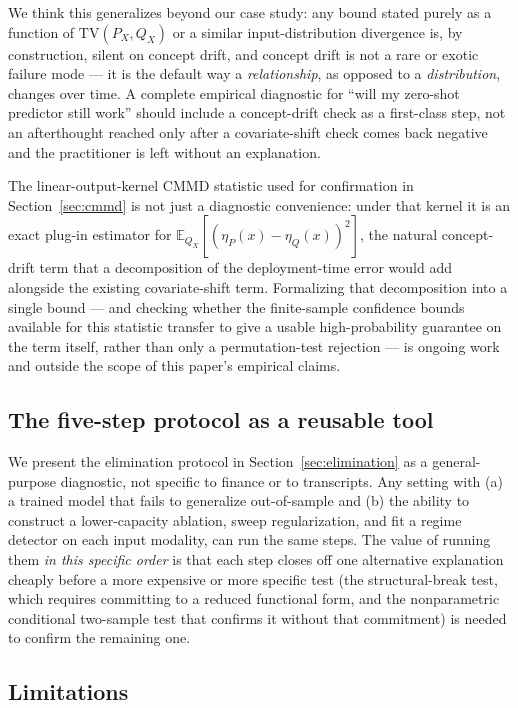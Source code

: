 \documentclass[11pt]{article}
\newcommand{\TV}{\mathrm{TV}}
\begin{document}
We think this generalizes beyond our case study: any bound stated purely as a function of $\TV(P_X,Q_X)$ or a similar input-distribution divergence is, by construction, silent on concept drift, and concept drift is not a rare or exotic failure mode --- it is the default way a \emph{relationship}, as opposed to a \emph{distribution}, changes over time. A complete empirical diagnostic for ``will my zero-shot predictor still work'' should include a concept-drift check as a first-class step, not an afterthought reached only after a covariate-shift check comes back negative and the practitioner is left without an explanation.

The linear-output-kernel CMMD statistic used for confirmation in Section~\ref{sec:cmmd} is not just a diagnostic convenience: under that kernel it is an exact plug-in estimator for $\mathbb{E}_{Q_X}[(\eta_P(x)-\eta_Q(x))^2]$, the natural concept-drift term that a decomposition of the deployment-time error would add alongside the existing covariate-shift term. Formalizing that decomposition into a single bound --- and checking whether the finite-sample confidence bounds available for this statistic \citep{massiani2025kernel} transfer to give a usable high-probability guarantee on the term itself, rather than only a permutation-test rejection --- is ongoing work and outside the scope of this paper's empirical claims.

\subsection{The five-step protocol as a reusable tool}

We present the elimination protocol in Section~\ref{sec:elimination} as a general-purpose diagnostic, not specific to finance or to transcripts. Any setting with (a) a trained model that fails to generalize out-of-sample and (b) the ability to construct a lower-capacity ablation, sweep regularization, and fit a regime detector on each input modality, can run the same steps. The value of running them \emph{in this specific order} is that each step closes off one alternative explanation cheaply before a more expensive or more specific test (the structural-break test, which requires committing to a reduced functional form, and the nonparametric conditional two-sample test that confirms it without that commitment) is needed to confirm the remaining one.

\subsection{Limitations}
\end{document}
